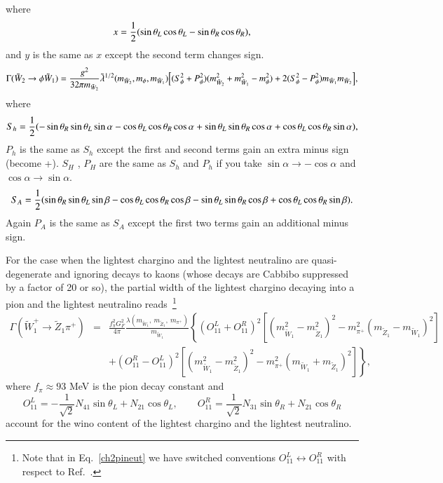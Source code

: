 \documentclass[final,3p,times]{elsarticle}
\begin{document}
where
\begin{equation}
x = {1 \over 2}(\sin \theta_L \cos \theta_L - \sin \theta_R \cos \theta_R),
\end{equation}
and $y$ is the same as $x$ except the second term changes sign.
\begin{equation}\label{ch2phich1}
\Gamma (\tilde{W}_2 \rightarrow \phi \tilde{W}_1) = {g^2 \over 32\pi m_{\tilde{W}_2} } \tilde{\lambda}^{1/2} (m_{\tilde{W}_2}, m_{\phi}, m_{\tilde{W}_1}) \Big[(S_{\phi}^2 + P_{\phi}^2) (m_{\tilde{W}_{2}}^2  + m_{\tilde{W}_{1}}^2 - m_{\phi}^2)  + 2(S_{\phi}^2 -P_{\phi}^2)m_{\tilde{W}_{1}}m_{\tilde{W}_{2}}\Big],
\end{equation} 
where
\begin{equation}
S_h = {1 \over 2} (-\sin \theta_R \sin \theta_L \sin \alpha - \cos \theta_L \cos \theta_R \cos \alpha + \sin \theta_L \sin \theta_R \cos \alpha + \cos \theta_L \cos \theta_R \sin \alpha )  ,
\end{equation}
$P_h$ is the same as $S_h$ except the first and second terms gain an extra minus sign (become +).
$S_H$ , $P_H$ are the same as $S_h$ and $P_h$ if you take $\sin\alpha \rightarrow -\cos\alpha$ and $\cos\alpha \rightarrow \sin\alpha$.
\begin{equation}
S_A = {1 \over 2} (\sin \theta_R \sin \theta_L \sin \beta - \cos \theta_L \cos \theta_R \cos \beta - \sin \theta_L \sin \theta_R \cos \beta + \cos \theta_L \cos \theta_R \sin \beta ).
\end{equation}
Again $P_A$ is the same as $S_A$ except the first two terms gain an additional
minus sign.


For the case when the lightest chargino and the lightest neutralino 
are quasi-degenerate and ignoring decays to
kaons (whose decays are Cabbibo suppressed 
by a factor of 20 or so), the partial width of the lightest chargino decaying
into a pion and the lightest
neutralino reads~\cite{gunionetal}\footnote{Note that  in Eq.~\ref{ch2pineut}
we have switched conventions $O^{L}_{11}\leftrightarrow O^R_{11}$ with respect
to Ref.~\cite{gunionetal}.}
\begin{eqnarray}
\Gamma( {\tilde W}_1^+ \rightarrow {\tilde Z}_1 \pi^+) &=& 
\frac{f_\pi^2 G_F^2}{4 \pi} \frac{\lambda(m_{{\tilde W}_1},\ m_{{\tilde
      Z}_1},\ m_{\pi^+})}{m_{{\tilde W}_1}}
\left\{ (O^L_{11} +O^R_{11})^2 \left[ (m_{{\tilde W}_1}^2 - m_{{\tilde
                                                           Z}_1}^2)^2 - 
m_{\pi^+}^2(m_{{\tilde Z}_1} - m_{{\tilde W}_1})^2 \right] \right. \nonumber \\
&&\left.  + (O^R_{11} - O^L_{11})^2 \left[ (m_{{\tilde W}_1}^2 - m_{{\tilde Z}_1}^2)^2 - m_{\pi^+}^2 (m_{{\tilde W}_1}
  + m_{{\tilde Z}_1})^2\right]
\right\}, \label{ch2pineut}
\end{eqnarray}
where $f_\pi \approx 93$ MeV is the pion decay constant and
\begin{equation}O^L_{11}=- \frac{1}{\sqrt{2}} N_{41} \sin \theta_L + 
N_{21} \cos \theta_L, \qquad
O^R_{11}=\frac{1}{\sqrt{2}} N_{31} \sin \theta_R + 
N_{21} \cos \theta_R \label{theBigO}\end{equation}
account for the wino content of the lightest chargino and the lightest neutralino.
\end{document}
